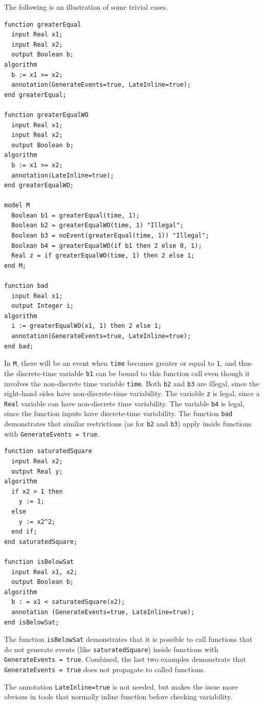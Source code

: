 \begin{annotationdefinition}[GenerateEvents]
\begin{semantics}
\begin{example}
The following is an illustration of some trivial cases.
\begin{lstlisting}[language=modelica]
function greaterEqual
  input Real x1;
  input Real x2;
  output Boolean b;
algorithm
  b := x1 >= x2;
  annotation(GenerateEvents=true, LateInline=true);
end greaterEqual;

function greaterEqualWO
  input Real x1;
  input Real x2;
  output Boolean b;
algorithm
  b := x1 >= x2;
  annotation(LateInline=true);
end greaterEqualWO;

model M
  Boolean b1 = greaterEqual(time, 1);
  Boolean b2 = greaterEqualWO(time, 1) "Illegal";
  Boolean b3 = noEvent(greaterEqual(time, 1)) "Illegal";
  Boolean b4 = greaterEqualWO(if b1 then 2 else 0, 1);
  Real z = if greaterEqualWO(time, 1) then 2 else 1;
end M;

function bad
  input Real x1;
  output Integer i;
algorithm
  i := greaterEqualWO(x1, 1) then 2 else 1;
  annotation(GenerateEvents=true, LateInline=true);
end bad;
\end{lstlisting}

In \lstinline!M!, there will be an event when \lstinline!time! becomes greater or equal to \lstinline!1!, and thus the discrete-time variable \lstinline!b1! can be bound to this function call even though it involves the non-discrete time variable \lstinline!time!.
Both \lstinline!b2! and \lstinline!b3! are illegal, since the right-hand sides have non-discrete-time variability.
The variable \lstinline!z! is legal, since a \lstinline!Real! variable can have non-discrete time variability.
The variable \lstinline!b4! is legal, since the function inputs have discrete-time variability.
The function \lstinline!bad! demonstrates that similar restrictions (as for \lstinline!b2! and \lstinline!b3!) apply inside functions with {\lstinline!GenerateEvents = true!}.
\begin{lstlisting}[language=modelica]
function saturatedSquare
  input Real x2;
  output Real y;
algorithm
  if x2 > 1 then
    y := 1;
  else
    y := x2^2;
  end if;
end saturatedSquare;

function isBelowSat
  input Real x1, x2;
  output Boolean b;
algorithm
  b : = x1 < saturatedSquare(x2);
  annotation (GenerateEvents=true, LateInline=true);
end isBelowSat;
\end{lstlisting}
The function \lstinline!isBelowSat! demonstrates that it is possible to call functions that do not generate events (like \lstinline!saturatedSquare!) inside functions with {\lstinline!GenerateEvents = true!}.
Combined, the last two examples demonstrate that {\lstinline!GenerateEvents = true!} does not propagate to called functions.

The annotation \lstinline!LateInline=true! is not needed, but makes the issue more obvious in tools that normally inline function before checking variability.
\end{example}
\end{semantics}
\end{annotationdefinition}



